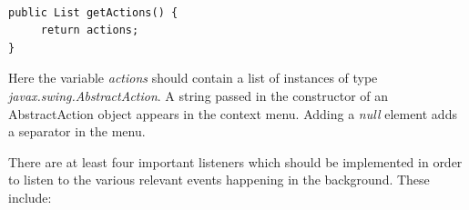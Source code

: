 \begin{small}\begin{verbatim}

public List getActions() {
     return actions;
}

\end{verbatim}\end{small}

Here the variable \textit{actions} should contain a list of instances of type
\textit{javax.swing.AbstractAction}. A string passed in the constructor of an
AbstractAction object appears in the context menu. Adding a \textit{null} element
adds a separator in the menu.


There are at least four important listeners which should be implemented in order
to listen to the various relevant events happening in the background. These
include:

